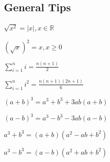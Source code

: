 \documentclass[5pt]{article}
\begin{document}
\subsection{General Tips}
\begin{itemize*}
    \item $\sqrt{x^2}=|x|,x\in\mathbb{R}$
    \item $(\sqrt{x})^2=x, x\geq 0$
    \item $\sum_{i=1}^{n}i=\frac{n(n+1)}{2}$
    \item $\sum_{i=1}^{n}i^2=\frac{n(n+1)(2n+1)}{6}$\\
    \item $(a+b)^3=a^3+b^3+3ab(a+b)$
    \item $(a-b)^3=a^3-b^3-3ab(a-b)$
    \item $a^3+b^3=(a+b)(a^2-ab+b^2)$
    \item $a^3-b^3=(a-b)(a^2+ab+b^2)$
\end{itemize*}
\end{document}
